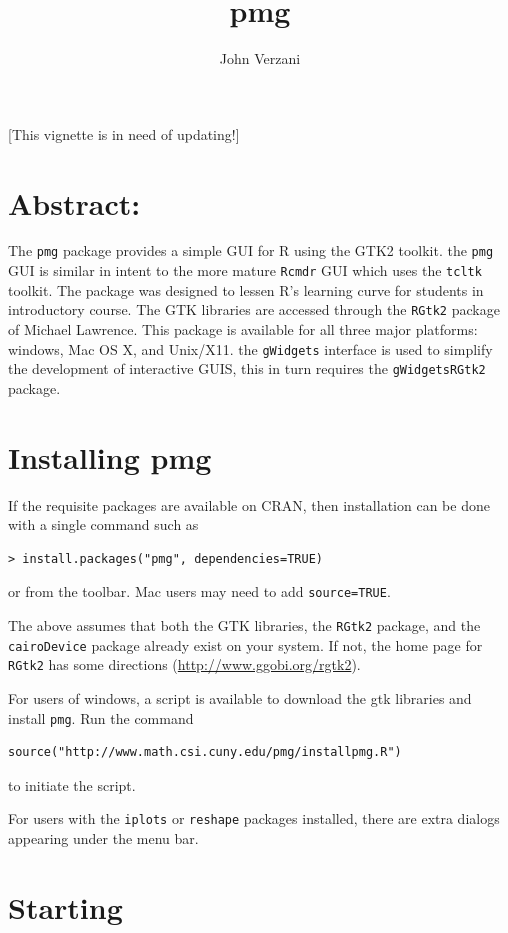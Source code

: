 \documentclass[12pt]{article}
\newcommand{\RCode}[1]{\texttt{#1}}
\begin{document}
\title{pmg}
\author{John Verzani}
\maketitle

[This vignette is in need of updating!]

\section*{Abstract:}

The \RCode{pmg} package provides a simple GUI for R using the GTK2
toolkit. the \RCode{pmg} GUI is similar in intent to the more mature
\RCode{Rcmdr} GUI which uses the \RCode{tcltk} toolkit. The package
was designed to lessen R's learning curve for students in introductory
course. The GTK libraries are accessed through the \RCode{RGtk2}
package of Michael Lawrence. This package is available for all three
major platforms: windows, Mac OS X, and Unix/X11.  the
\RCode{gWidgets} interface is used to simplify the development of
interactive GUIS, this in turn requires the \RCode{gWidgetsRGtk2}
package.

\section{Installing pmg}
If the requisite packages are available on CRAN, then installation can
be done with a single command such as
\begin{verbatim}
> install.packages("pmg", dependencies=TRUE)
\end{verbatim}
or from the toolbar. Mac users may need to add \RCode{source=TRUE}.


The above assumes that both the GTK libraries, the \RCode{RGtk2}
package, and the \RCode{cairoDevice} package already exist on your
system. If not, the home page for \RCode{RGtk2} has some directions
(\url{http://www.ggobi.org/rgtk2}).

For users of windows, a script is available to download the gtk
libraries and install \RCode{pmg}. Run the command
\begin{verbatim}
source("http://www.math.csi.cuny.edu/pmg/installpmg.R")
\end{verbatim}
to initiate the script.

For users with the \RCode{iplots} or \RCode{reshape} packages
installed, there are extra dialogs appearing under the menu bar.

\section{Starting}
\end{document}
